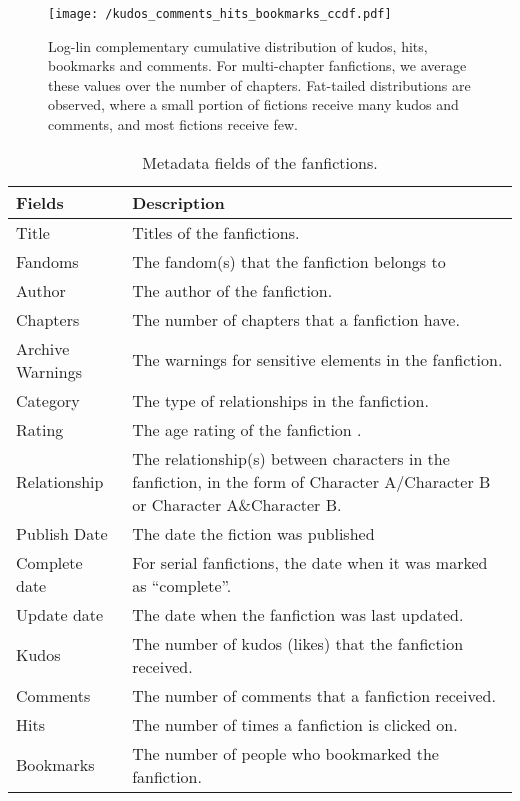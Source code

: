 \documentclass[letterpaper]{article} %
\begin{document}
    
\begin{figure*}
    \centering
       \texttt{[image: /kudos\_comments\_hits\_bookmarks\_ccdf.pdf]}
        \caption{Log-lin complementary cumulative distribution of kudos, hits, bookmarks and comments. For multi-chapter fanfictions, we average these values over the number of chapters. Fat-tailed distributions are observed, where a small portion of fictions receive many kudos and comments, and most fictions receive few.}
        \label{fig:kudos_dist}
    \end{figure*}



\begin{table*}
\centering
\begin{tabular}[width=0.8\textwidth]{p{3cm}p{10cm}}
\toprule
Fields & Description \\ 
   \hline			
Title & Titles of the fanfictions.  \\
Fandoms & The fandom(s) that the fanfiction belongs to \\
Author & The author of the fanfiction.  \\
Chapters & The number of chapters that a fanfiction have. \\
Archive Warnings & The warnings for sensitive elements in the fanfiction. \\
Category & The type of relationships in the fanfiction. \\
Rating & The age rating of the fanfiction . \\
Relationship & The relationship(s) between characters in the fanfiction, in the form of Character A/Character B
or Character A\&Character B. \\
Publish Date & The date the fiction was published \\
Complete date & For serial fanfictions, the date when it was marked as ``complete''.\\
Update date & The date when the fanfiction was last updated. \\
\hline
Kudos & The number of kudos (likes) that the fanfiction received. \\
Comments & The number of comments that a fanfiction received.\\
Hits & The number of times a fanfiction is clicked on. \\
Bookmarks & The number of people who bookmarked the fanfiction.\\

\bottomrule
\end{tabular}
\caption{Metadata fields of the fanfictions.}
\label{tab:metadata}
\end{table*}%
\end{document}
